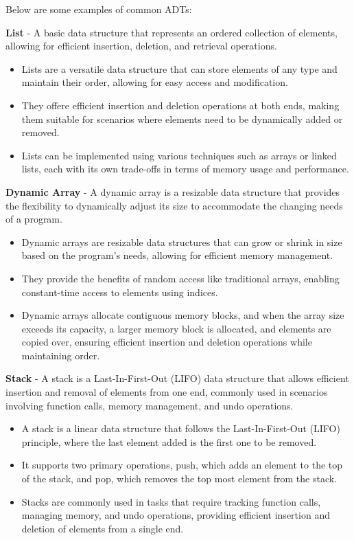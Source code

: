\begin{solution}
    Below are some examples of common ADTs:

    \textbf{List} - A basic data structure that represents an ordered collection of elements, allowing for efficient insertion, deletion, and retrieval operations.
    \begin{itemize}
        \item Lists are a versatile data structure that can store elements of any type and maintain their order, allowing for easy access and modification.
        \item They offere efficient insertion and deletion operations at both ends, making them suitable for scenarios where elements need to be dynamically added or removed.
        \item Lists can be implemented using various techniques such as arrays or linked lists, each with its own trade-offs in terms of memory usage and performance.
    \end{itemize}

    \textbf{Dynamic Array} - A dynamic array is a resizable data structure that provides the flexibility to dynamically adjust its size to accommodate the changing
    needs of a program.
    \begin{itemize}
        \item Dynamic arrays are resizable data structures that can grow or shrink in size based on the program's needs, allowing for efficient memory management.
        \item They provide the benefits of random access like traditional arrays, enabling constant-time access to elements using indices.
        \item Dynamic arrays allocate contiguous memory blocks, and when the array size exceeds its capacity, a larger memory block is allocated, and elements are copied over,
        ensuring efficient insertion and deletion operations while maintaining order.
    \end{itemize}

    \textbf{Stack} - A stack is a Last-In-First-Out (LIFO) data structure that allows efficient insertion and removal of elements from one end, commonly used in scenarios
    involving function calls, memory management, and undo operations.
    \begin{itemize}
        \item A stack is a linear data structure that follows the Last-In-First-Out (LIFO) principle, where the last element added is the first one to be removed.
        \item It supports two primary operations, push, which adds an element to the top of the stack, and pop, which removes the top most element from the stack.
        \item Stacks are commonly used in tasks that require tracking function calls, managing memory, and undo operations, providing efficient insertion and deletion of elements from
        a single end.
    \end{itemize}


\end{solution}
